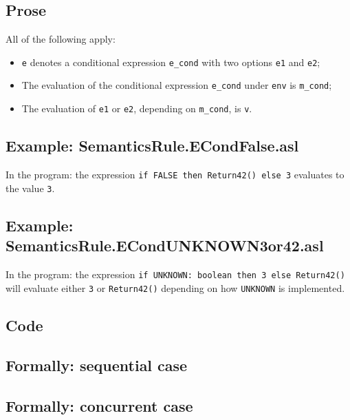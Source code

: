 \documentclass{book}
\begin{document}
  \subsection{Prose}
  All of the following apply:
  \begin{itemize}
  \item \texttt{e} denotes a conditional expression \texttt{e\_cond} with two options \texttt{e1} and \texttt{e2};
  \item The evaluation of the conditional expression \texttt{e\_cond} under \texttt{env} is \texttt{m\_cond};
  \item The evaluation of \texttt{e1} or \texttt{e2}, depending on \texttt{m\_cond}, is \texttt{v}.
  \end{itemize}

  \subsection{Example: SemanticsRule.ECondFalse.asl}
    In the program:
    the expression \texttt{if FALSE then Return42() else 3} evaluates to the value \texttt{3}.

  \subsection{Example: \\ SemanticsRule.ECondUNKNOWN3or42.asl}
    In the program:
the expression \texttt{if UNKNOWN: boolean then 3 else Return42()} will
evaluate either \texttt{3} or \texttt{Return42()} depending on how
\texttt{UNKNOWN} is implemented.

  \subsection{Code}

\begin{emptyformal}
  \subsection{Formally: sequential case}

  \subsection{Formally: concurrent case}
\end{emptyformal}
\end{document}
